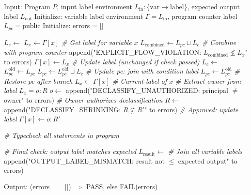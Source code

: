 \begin{algorithmic}
\State Input: Program $P$, input label environment $L_{\text{in}}: \{\text{var} \to \text{label}\}$, expected output label $L_{\text{out}}$
\State Initialize: variable label environment $\Gamma = L_{\text{in}}$, program counter label $L_{pc} = \text{public}$
\State Initialize: errors = []

    \State $L_e \gets$ 
    \State $L_x \gets \Gamma[x]$ \textit{\# Get label for variable $x$}
    \State $L_{\text{combined}} \gets L_{pc} \sqcup L_e$ \textit{\# Combine with program counter}
      \State append("EXPLICIT\_FLOW\_VIOLATION: $L_{\text{combined}} \not\leq L_x$" to errors)
    \EndIf
    \State $\Gamma[x] \gets L_x$ \textit{\# Update label (unchanged if check passed)}
    \State $L_c \gets$ 
    \State $L_{pc}^{\text{old}} \gets L_{pc}$
    \State $L_{pc} \gets L_{pc}^{\text{old}} \sqcup L_c$ \textit{\# Update pc: join with condition label}
    \State {}
    \State {}
    \State $L_{pc} \gets L_{pc}^{\text{old}}$ \textit{\# Restore pc after branch}
    \State $L_x \gets \Gamma[x]$ \textit{\# Current label of $x$}
    \State \textit{\# Extract owner from label $L_x = o: R$}
    \State $o \gets$ 
      \State append("DECLASSIFY\_UNAUTHORIZED: principal $\neq$ owner" to errors)
    \Else
      \State \textit{\# Owner authorizes declassification}
      \State $R \gets$ 
        \State append("DECLASSIFY\_SHRINKING: $R \not\subseteq R'$" to errors)
      \Else
        \State \textit{\# Approved: update label}
        \State $\Gamma[x] \gets o: R'$
      \EndIf
    \EndIf
  \EndIf
\EndFunction

\State \textit{\# Typecheck all statements in program}
  \State {}
\EndFor

\State \textit{\# Final check: output label matches expected}
\State $L_{\text{result}} \gets$  \textit{\# Join all variable labels}
  \State append("OUTPUT\_LABEL\_MISMATCH: result not $\leq$ expected output" to errors)
\EndIf

\State Output: (errors == []) $\Rightarrow$ PASS, else FAIL(errors)
\end{algorithmic}

